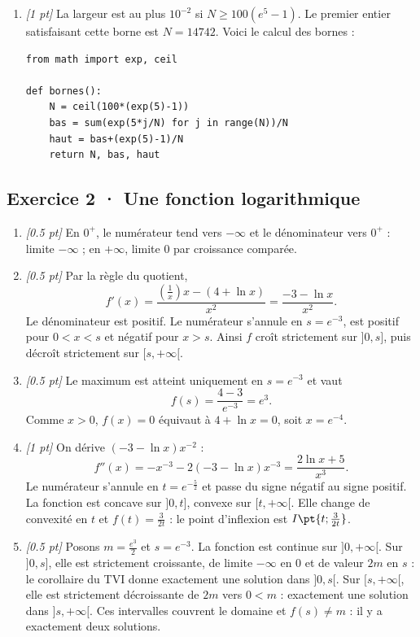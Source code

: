 \begin{enumerate}

\item \textit{[1 pt]} La largeur est au plus $10^{-2}$ si $N\ge100(e^{5}-1)$. Le premier entier satisfaisant cette borne est $N=14742$. Voici le calcul des bornes :
\begin{lstlisting}
from math import exp, ceil

def bornes():
    N = ceil(100*(exp(5)-1))
    bas = sum(exp(5*j/N) for j in range(N))/N
    haut = bas+(exp(5)-1)/N
    return N, bas, haut
\end{lstlisting}


\end{enumerate}

\subsection*{Exercice 2 · Une fonction logarithmique}\begin{enumerate}

\item \textit{[\num{0,5} pt]} En $0^+$, le numérateur tend vers $-\infty$ et le dénominateur vers $0^+$ : limite $-\infty$ ; en $+\infty$, limite $0$ par croissance comparée.

\item \textit{[\num{0,5} pt]} Par la règle du quotient,
\[f'(x)=\frac{(\frac{1}{x})x-(4+\ln x)}{x^2}=\frac{-3-\ln x}{x^2}.\]
Le dénominateur est positif. Le numérateur s'annule en $s=e^{-3}$, est positif pour $0<x<s$ et négatif pour $x>s$. Ainsi $f$ croît strictement sur $]0,s]$, puis décroît strictement sur $[s,+\infty[$.

\item \textit{[\num{0,5} pt]} Le maximum est atteint uniquement en $s=e^{-3}$ et vaut
\[f(s)=\frac{4- 3}{e^{-3}}=e^{3}.\]
Comme $x>0$, $f(x)=0$ équivaut à $4+\ln x=0$, soit $x=e^{-4}$.

\item \textit{[1 pt]} On dérive $(-3-\ln x)x^{-2}$ :
\[f''(x)=-x^{-3}-2(-3-\ln x)x^{-3}=\frac{2\ln x+5}{x^3}.\]
Le numérateur s'annule en $t=e^{-\frac{5}{2}}$ et passe du signe négatif au signe positif. La fonction est concave sur $]0,t]$, convexe sur $[t,+\infty[$. Elle change de convexité en $t$ et $f(t)=\frac{3}{2t}$ : le point d'inflexion est $I\pt{t;\frac{3}{2t}}$.

\item \textit{[\num{0,5} pt]} Posons $m=\frac{e^{3}}{2}$ et $s=e^{-3}$. La fonction est continue sur $]0,+\infty[$. Sur $]0,s]$, elle est strictement croissante, de limite $-\infty$ en $0$ et de valeur $2m$ en $s$ : le corollaire du TVI donne exactement une solution dans $]0,s[$. Sur $[s,+\infty[$, elle est strictement décroissante de $2m$ vers $0<m$ : exactement une solution dans $]s,+\infty[$. Ces intervalles couvrent le domaine et $f(s)\ne m$ : il y a exactement deux solutions.


\end{enumerate}
